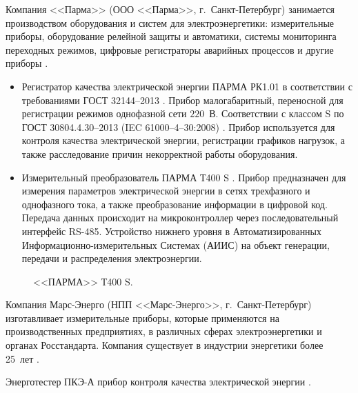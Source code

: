 Компания <<Парма>> (ООО <<Парма>>, г.~Санкт-Петербург) занимается производством оборудования и систем для электроэнергетики: измерительные приборы, оборудование релейной защиты и автоматики, системы мониторинга переходных режимов, цифровые регистраторы аварийных процессов и другие приборы \cite{parma}. 

\begin{itemize}
	\item Регистратор качества электрической энергии ПАРМА РК1.01 \cite{parma2} в соответствии с требованиями ГОСТ 32144–2013 \cite{ГОСТ32144-2013}. 
	Прибор малогабаритный, переносной для регистрации режимов однофазной сети $220$~В. Соответствии с классом S по ГОСТ 30804.4.30–2013 (IEC 61000–4–30:2008) \cite{ГОСТ30804.4.30-2013}. Прибор используется для контроля качества электрической энергии, регистрации графиков нагрузок, а также расследование причин некорректной работы оборудования.
	 
	\item Измерительный преобразователь ПАРМА Т400 S \cite{parma1}.
	Прибор предназначен для измерения параметров электрической энергии в сетях трехфазного и однофазного тока, а также преобразование информации в цифровой код. Передача данных происходит на микроконтроллер через последовательный интерфейс RS-485. Устройство нижнего уровня в Автоматизированных Информационно-измерительных Системах (АИИС) на объект генерации, передачи и распределения электроэнергии.
\end{itemize}

\begin{figure}[ht]
	\caption{<<ПАРМА>> Т400 S.}\label{fig:picture9}
\end{figure}

Компания Марс-Энерго (НПП <<Марс-Энерго>>, г.~Санкт-Петербург) изготавливает измерительные приборы, которые применяются на производственных предприятиях, в различных сферах электроэнергетики и органах Росстандарта. Компания существует в индустрии энергетики более 25~лет \cite{Марс-Энерго}.

Энерготестер ПКЭ-А прибор контроля качества электрической энергии \cite{энерготестер}.

